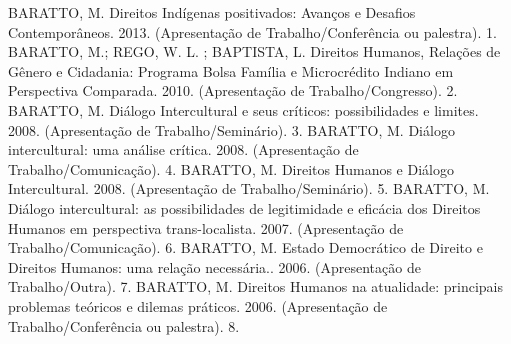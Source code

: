 \begin{cvhonors}
  \cvhonor
    {BARATTO, M.}
    {Direitos Indígenas positivados: Avanços e Desafios Contemporâneos. 2013. (Apresentação de Trabalho/Conferência ou palestra).}
    {}
    {1. }
  \cvhonor
    {BARATTO, M.; REGO, W. L. ; BAPTISTA, L.}
    {Direitos Humanos, Relações de Gênero e Cidadania: Programa Bolsa Família e Microcrédito Indiano em Perspectiva Comparada. 2010. (Apresentação de Trabalho/Congresso).}
    {}
    {2. }
  \cvhonor
    {BARATTO, M.}
    {Diálogo Intercultural e seus críticos: possibilidades e limites. 2008. (Apresentação de Trabalho/Seminário).}
    {}
    {3. }
  \cvhonor
    {BARATTO, M.}
    {Diálogo intercultural: uma análise crítica. 2008. (Apresentação de Trabalho/Comunicação).}
    {}
    {4. }
  \cvhonor
    {BARATTO, M.}
    {Direitos Humanos e Diálogo Intercultural. 2008. (Apresentação de Trabalho/Seminário).}
    {}
    {5. }
  \cvhonor
    {BARATTO, M.}
    {Diálogo intercultural: as possibilidades de legitimidade e eficácia dos Direitos Humanos em perspectiva trans-localista. 2007. (Apresentação de Trabalho/Comunicação).}
    {}
    {6. }
  \cvhonor
    {BARATTO, M.}
    {Estado Democrático de Direito e Direitos Humanos: uma relação necessária.. 2006. (Apresentação de Trabalho/Outra).}
    {}
    {7. }
  \cvhonor
    {BARATTO, M.}
    {Direitos Humanos na atualidade: principais problemas teóricos e dilemas práticos. 2006. (Apresentação de Trabalho/Conferência ou palestra).}
    {}
    {8. }
\end{cvhonors}


